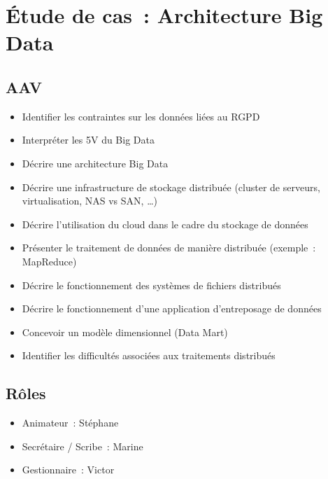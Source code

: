 \newpage
\section*{Étude de cas~: Architecture Big Data}
{}

\subsection*{AAV}
{}
\begin{itemize}
	\item [1] Identifier les contraintes sur les données liées au RGPD
	\item [2] Interpréter les 5V du Big Data
	\item [2] Décrire une architecture Big Data
	\item [2] Décrire une infrastructure de stockage distribuée (cluster de serveurs, virtualisation, NAS vs SAN, \dots)
	\item [2] Décrire l'utilisation du cloud dans le cadre du stockage de données
	\item [3] Présenter le traitement de données de manière distribuée (exemple~: MapReduce)
	\item [2] Décrire le fonctionnement des systèmes de fichiers distribués
	\item [2] Décrire le fonctionnement d'une application d'entreposage de données
	\item [3] Concevoir un modèle dimensionnel (Data Mart)
	\item [1] Identifier les difficultés associées aux traitements distribués
\end{itemize}

\subsection*{Rôles}
{}
\begin{itemize}
	\item Animateur~: Stéphane
	\item Secrétaire / Scribe~: Marine
	\item Gestionnaire~: Victor
\end{itemize}

